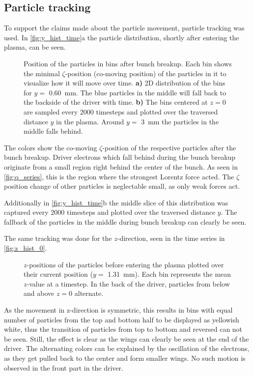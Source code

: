 \documentclass[bachelor_thesis]{subfiles}
\begin{document}
\subsection{Particle tracking}
To support the claims made about the particle movement, particle tracking was used. In \autoref{fig:y_hist_time}a the particle distribution, shortly after entering the plasma, can be seen.
\begin{figure}
	\centering
	
	\caption{Position of the particles in bins after bunch breakup. Each bin shows the minimal $\zeta$-position (co-moving position) of the particles in it to visualize how it will move over time.
	\textbf{a)} 2D distribution of the bins for $y=$ \qty{0.60}{\mm}. The blue particles in the middle will fall back to the backside of the driver with time.
	\textbf{b)} The bins centered at $z=0$ are sampled every 2000 timesteps and plotted over the traversed distance $y$ in the plasma. Around $y=$ \qty{3}{mm} the particles in the middle falls behind.}
	\label{fig:y_hist_time}
\end{figure}
The colors show the co-moving $\zeta$-position of the respective particles after the bunch breakup. Driver electrons which fall behind during the bunch breakup originate from a small region right behind the center of the bunch. 
As seen in \autoref{fig:q_series}, this is the region where the strongest Lorentz force acted.
The $\zeta$ position change of other particles is neglectable small, as only weak forces act.

Additionally in \autoref{fig:y_hist_time}b the middle slice of this distribution was captured every 2000 timesteps and plotted over the traversed distance $y$. The fallback of the particles in the middle during bunch breakup can clearly be seen.

The same tracking was done for the $z$-direction, seen in the time series in \autoref{fig:z_hist_0}.
\begin{figure}
	\centering
	
	\caption{$z$-positions of the particles before entering the plasma plotted over their current position ($y=$ \qty{1.31}{mm}). Each bin represents the mean $z$-value at a timestep. In the back of the driver, 
	particles from below and above $z=0$ alternate. }
	\label{fig:z_hist_0}
\end{figure}
As the movement in z-direction is symmetric, this results in bins with equal number of particles from the top and bottom half to be displayed as yellowish white, thus the transition of particles from top to bottom and reversed can not be seen. Still, the effect is clear as the wings can clearly be seen at the end of the driver.
The alternating colors can be explained by the oscillation of the electrons, as they get pulled back to the center and form smaller wings. No such motion is observed in the front part in the driver.
\end{document}
